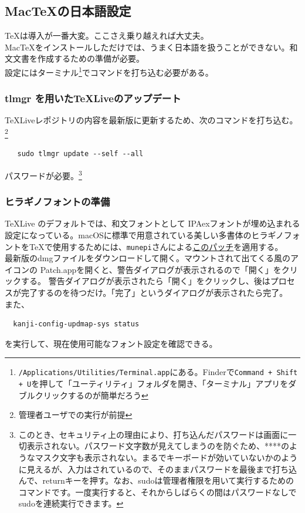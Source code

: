 \documentclass[dvipdfmx,jb5]{jreport}
\newcommand{\link}[2]{\href{#2}{#1}}
\begin{document}
\subsection{Mac\TeX の日本語設定}
\TeX は導入が一番大変。ここさえ乗り越えれば大丈夫。\\
Mac\TeX をインストールしただけでは、うまく日本語を扱うことができない。和文文書を作成するための準備が必要。\\
設定にはターミナル\footnote{\texttt{/Applications/Utilities/Terminal.app}にある。Finderで\texttt{Command + Shift + U}を押して「ユーティリティ」フォルダを開き、「ターミナル」アプリをダブルクリックするのが簡単だろう}でコマンドを打ち込む必要がある。
\subsubsection{tlmgr を用いた\TeX Liveのアップデート}
\TeX Liveレポジトリの内容を最新版に更新するため、次のコマンドを打ち込む。\footnote{管理者ユーザでの実行が前提}
\begin{lstlisting}
   sudo tlmgr update --self --all
  \end{lstlisting}
パスワードが必要。\footnote{このとき、セキュリティ上の理由により、打ち込んだパスワードは画面に一切表示されない。パスワード文字数が見えてしまうのを防ぐため、****のようなマスク文字も表示されない。まるでキーボードが効いていないかのように見えるが、入力はされているので、そのままパスワードを最後まで打ち込んで、returnキーを押す。なお、sudoは管理者権限を用いて実行するためのコマンドです。一度実行すると、それからしばらくの間はパスワードなしでsudoを連続実行できます。}
\subsubsection{ヒラギノフォントの準備}
\TeX Live のデフォルトでは、和文フォントとして IPAexフォントが埋め込まれる設定になっている。macOSに標準で用意されている美しい多書体のヒラギノフォントを\TeX で使用するためには、\verb|munepi|さんによる\link{このパッチ}{https://github.com/munepi/bibunsho7-patch/releases}を適用する。\\
最新版のdmgファイルをダウンロードして開く。マウントされて出てくる風のアイコンの Patch.appを開くと、警告ダイアログが表示されるので「開く」をクリックする。
警告ダイアログが表示されたら「開く」をクリックし、後はプロセスが完了するのを待つだけ。「完了」というダイアログが表示されたら完了。\\
また、
\begin{lstlisting}
  kanji-config-updmap-sys status
  \end{lstlisting}
を実行して、現在使用可能なフォント設定を確認できる。
\end{document}
